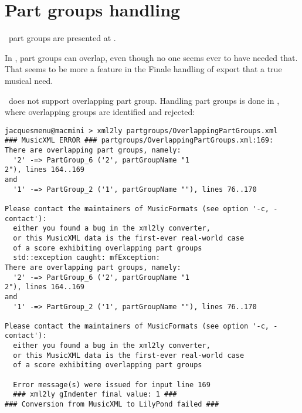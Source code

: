



\chapter{Part groups handling}\label{Part groups handling}

\mf\ part groups are presented at .

In \mxml, part groups can overlap, even though no one seems ever to have needed that. That seems to be more a feature in the Finale handling of \mxml export that a true musical need.

\msrRepr\ does not support overlapping part group. Handling part groups is done in , where overlapping groups are identified and rejected:
\begin{lstlisting}[language=Terminal]
jacquesmenu@macmini > xml2ly partgroups/OverlappingPartGroups.xml
### MusicXML ERROR ### partgroups/OverlappingPartGroups.xml:169:
There are overlapping part groups, namely:
  '2' -=> PartGroup_6 ('2', partGroupName "1
2"), lines 164..169
and
  '1' -=> PartGroup_2 ('1', partGroupName ""), lines 76..170

Please contact the maintainers of MusicFormats (see option '-c, -contact'):
  either you found a bug in the xml2ly converter,
  or this MusicXML data is the first-ever real-world case
  of a score exhibiting overlapping part groups
  std::exception caught: mfException:
There are overlapping part groups, namely:
  '2' -=> PartGroup_6 ('2', partGroupName "1
2"), lines 164..169
and
  '1' -=> PartGroup_2 ('1', partGroupName ""), lines 76..170

Please contact the maintainers of MusicFormats (see option '-c, -contact'):
  either you found a bug in the xml2ly converter,
  or this MusicXML data is the first-ever real-world case
  of a score exhibiting overlapping part groups

  Error message(s) were issued for input line 169
  ### xml2ly gIndenter final value: 1 ###
### Conversion from MusicXML to LilyPond failed ###
\end{lstlisting}

